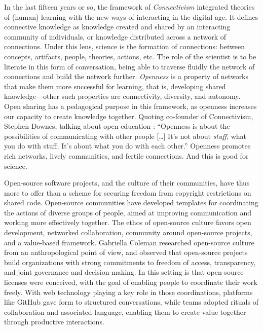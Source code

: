 \documentclass{statement}
\newlength{\up}
\begin{document}
In the last fifteen years or so, the framework of \emph{Connectivism} integrated theories of (human) learning with the new ways of interacting in the digital age. 
It defines connective knowledge as knowledge created and shared by an interacting community of individuals, or knowledge distributed across a network of connections. 
Under this lens, science is the formation of connections: between concepts, artifacts, people, theories, actions, etc. 
The role of the scientist is to be literate in this form of conversation, being able to traverse fluidly the network of connections and build the network further. 
\emph{Openness} is a property of networks that make them more successful for learning, that is, developing shared knowledge---other such properties are connectivity, diversity, and autonomy. 
Open sharing has a pedagogical purpose in this framework, as openness increases our capacity to create knowledge together. 
Quoting co-founder of Connectivism, Stephen Downes, talking about open education \citep{downes2017}: 
``Openness is about the possibilities of communicating with other people […] It’s not about \emph{stuff}, what you do with stuff. It’s about what you do with each other.'' 
Openness promotes rich networks, lively communities, and fertile connections. 
And this is good for science.

Open-source software projects, and the culture of their communities, have thus more to offer than a scheme for securing freedom from copyright restrictions on shared code. 
Open-source communities have developed templates for coordinating the actions of diverse groups of people, aimed at improving communication and working more effectively together. 
The ethos of open-source culture favors open development, networked collaboration, community around open-source projects, and a value-based framework. 
Gabriella Coleman \citep{coleman2012} researched open-source culture from an anthropological point of view, and observed that open-source projects build organizations with strong commitments to freedom of access, transparency, and joint governance and decision-making. 
In this setting is that open-source licenses were conceived, with the goal of enabling people to coordinate their work freely. 
With web technology playing a key role in those coordinations, platforms like GitHub gave form to structured conversations, while teams adopted rituals of collaboration and associated language, enabling them to create value together through productive interactions.
\end{document}
